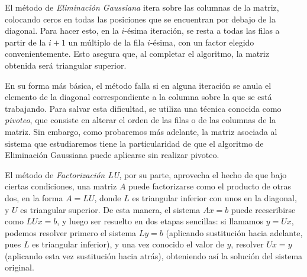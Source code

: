   El método de \emph{Eliminación Gaussiana} itera sobre las columnas de la matriz, colocando ceros en todas las posiciones que se encuentran por debajo de la diagonal. Para hacer esto, en la $i$-ésima iteración, se resta a todas las filas a partir de la $i + 1$ un múltiplo de la fila $i$-ésima, con un factor elegido convenientemente. Esto asegura que, al completar el algoritmo, la matriz obtenida será triangular superior.

  En su forma más básica, el método falla si en alguna iteración se anula el elemento de la diagonal correspondiente a la columna sobre la que se está trabajando. Para salvar esta dificultad, se utiliza una técnica conocida como \emph{pivoteo}, que consiste en alterar el orden de las filas o de las columnas de la matriz. Sin embargo, como probaremos más adelante, la matriz asociada al sistema que estudiaremos tiene la particularidad de que el algoritmo de Eliminación Gaussiana puede aplicarse sin realizar pivoteo.

  El método de \emph{Factorización LU}, por su parte, aprovecha el hecho de que bajo ciertas condiciones, una matriz $A$ puede factorizarse como el producto de otras dos, en la forma $A = LU$, donde $L$ es triangular inferior con unos en la diagonal, y $U$ es triangular superior. De esta manera, el sistema $Ax=b$ puede reescribirse como $LUx=b$, y luego ser resuelto en dos etapas sencillas: si llamamos $y=Ux$, podemos resolver primero el sistema $Ly=b$ (aplicando sustitución hacia adelante, pues $L$ es triangular inferior), y una vez conocido el valor de $y$, resolver $Ux=y$ (aplicando esta vez sustitución hacia atrás), obteniendo así la solución del sistema original.
